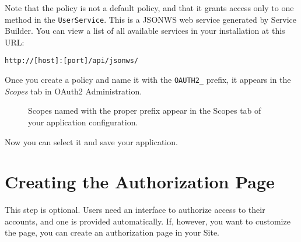 Note that the policy is not a default policy, and that it grants access
only to one method in the \texttt{UserService}. This is a JSONWS web
service generated by Service Builder. You can view a list of all
available services in your installation at this URL:

\begin{verbatim}
http://[host]:[port]/api/jsonws/
\end{verbatim}

Once you create a policy and name it with the \texttt{OAUTH2\_} prefix,
it appears in the \emph{Scopes} tab in OAuth2 Administration.

\begin{figure}
\centering
{}
\caption{Scopes named with the proper prefix appear in the Scopes tab of
your application configuration.}
\end{figure}

Now you can select it and save your application.

\section{Creating the Authorization
Page}\label{creating-the-authorization-page}

This step is optional. Users need an interface to authorize access to
their accounts, and one is provided automatically. If, however, you want
to customize the page, you can create an authorization page in your
Site.

